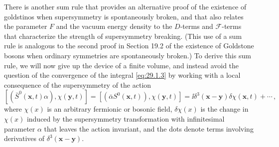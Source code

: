 There is another sum rule that provides an alternative proof of the
existence of goldstinos when supersymmetry is spontaneously broken, and
that also relates the parameter \(F\) and the vacuum energy density to the
\(D\)-terms and \(\mathcal{F}\)-terms that characterize the strength of
supersymmetry breaking. (This use of a sum rule is analogous to the second
proof in Section 19.2 of the existence of Goldstone bosons when ordinary
symmetries are spontaneously broken.) To derive this sum rule, we will now
give up the device of a finite volume, and instead avoid the question of
the convergence of the integral \eqref{eq:29.1.3} by working with a local
consequence of the supersymmetry of the action
\begin{equation}
  \left[(\bar S^0(\mathbf x,t)\alpha),\chi(\mathbf y,t)\right]
  =
  \left[(\bar\alpha S^0(\mathbf x,t)),\chi(\mathbf y,t)\right]
  =
  \ii\delta^3(\mathbf x-\mathbf y)\delta\chi(\mathbf x,t)+\cdots\,,
  \tag{29.2.11}\label{eq:29.2.11}
\end{equation}
where \(\chi(x)\) is an arbitrary fermionic or bosonic field,
\(\delta\chi(x)\) is the change in \(\chi(x)\) induced by the supersymmetry
transformation with infinitesimal parameter \(\alpha\) that leaves the
action invariant, and the dots denote terms involving derivatives of
\(\delta^3(\mathbf x-\mathbf y)\).

